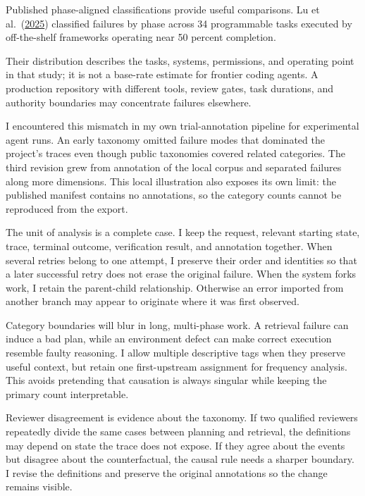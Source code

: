 Published phase-aligned classifications provide useful comparisons. Lu et al.~(\href{https://arxiv.org/abs/2508.13143}{2025}) classified failures by phase across 34 programmable tasks executed by off-the-shelf frameworks operating near 50 percent completion.

Their distribution describes the tasks, systems, permissions, and operating point in that study; it is not a base-rate estimate for frontier coding agents. A production repository with different tools, review gates, task durations, and authority boundaries may concentrate failures elsewhere.

I encountered this mismatch in my own trial-annotation pipeline for experimental agent runs. An early taxonomy omitted failure modes that dominated the project's traces even though public taxonomies covered related categories. The third revision grew from annotation of the local corpus and separated failures along more dimensions. This local illustration also exposes its own limit: the published manifest contains no annotations, so the category counts cannot be reproduced from the export.

The unit of analysis is a complete case. I keep the request, relevant starting state, trace, terminal outcome, verification result, and annotation together. When several retries belong to one attempt, I preserve their order and identities so that a later successful retry does not erase the original failure. When the system forks work, I retain the parent-child relationship. Otherwise an error imported from another branch may appear to originate where it was first observed.

Category boundaries will blur in long, multi-phase work. A retrieval failure can induce a bad plan, while an environment defect can make correct execution resemble faulty reasoning. I allow multiple descriptive tags when they preserve useful context, but retain one first-upstream assignment for frequency analysis. This avoids pretending that causation is always singular while keeping the primary count interpretable.

Reviewer disagreement is evidence about the taxonomy. If two qualified reviewers repeatedly divide the same cases between planning and retrieval, the definitions may depend on state the trace does not expose. If they agree about the events but disagree about the counterfactual, the causal rule needs a sharper boundary. I revise the definitions and preserve the original annotations so the change remains visible.

